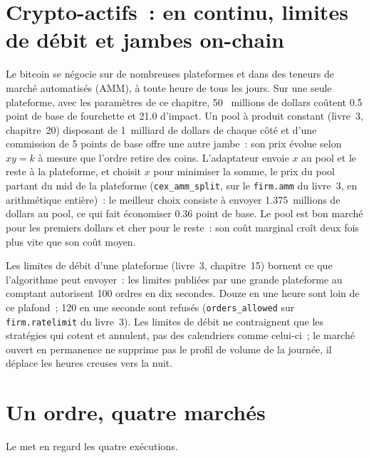 \section{Crypto-actifs~: en continu, limites de débit et jambes on-chain}

Le bitcoin se négocie sur de nombreuses plateformes et dans des teneurs de marché automatisés (AMM), à toute heure de tous les jours. Sur une seule plateforme, avec les paramètres de ce chapitre, 50~
millions de dollars coûtent 0.5 point de base de fourchette et 21.0 d'impact. Un pool à produit constant (livre~3, chapitre~20) disposant de 1~milliard de dollars de chaque côté et
d'une commission de 5 points de base offre une autre jambe~: son prix évolue selon $xy=k$ à mesure que l'ordre retire des coins. L'adaptateur envoie $x$ au pool et le reste à
la plateforme, et choisit $x$ pour minimiser la somme, le prix du pool partant du mid de la plateforme (\texttt{cex\_amm\_split}, sur le
\texttt{firm.amm} du livre~3, en arithmétique entière)~: le meilleur choix consiste à envoyer 1.375~millions de dollars au pool, ce qui fait économiser 0.36 point de base. Le pool est bon marché pour les premiers dollars et cher pour
le reste~: son coût marginal croît deux fois plus vite que son coût moyen.

Les limites de débit d'une plateforme (livre~3, chapitre~15) bornent ce que l'algorithme peut envoyer~: les limites publiées par une grande plateforme au comptant autorisent 100 ordres en dix
secondes. Douze  en une heure sont loin de ce plafond~; 120 en une seconde sont refusés (\texttt{orders\_allowed} sur
\texttt{firm.ratelimit} du livre~3). Les limites de débit ne contraignent que les stratégies qui cotent et annulent, pas des calendriers comme celui-ci~; le marché ouvert en permanence ne
supprime pas le profil de volume de la journée, il déplace les heures creuses vers la nuit.

\section{Un ordre, quatre marchés}

Le  met en regard les quatre exécutions.

